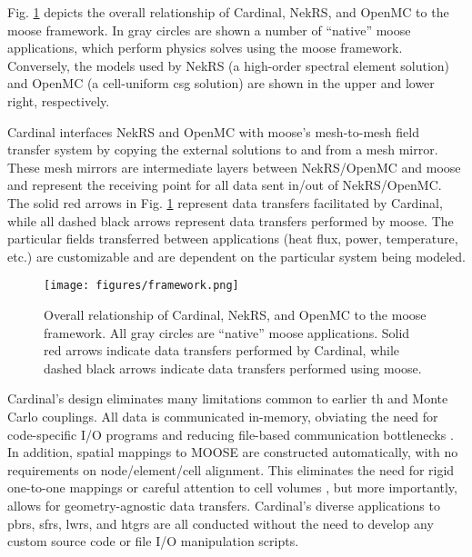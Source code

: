 \documentclass[3p,,preprint,11pt]{elsarticle}
\begin{document}
Fig. \ref{fig:framework} depicts the overall relationship of Cardinal, NekRS, and OpenMC to the \gls{moose} framework. In gray circles are shown a number of ``native'' \gls{moose} applications, which perform physics solves using the \gls{moose} framework. Conversely, the models used by NekRS (a high-order spectral element solution) and OpenMC (a cell-uniform \gls{csg} solution) are shown in the upper and lower right, respectively. 

Cardinal interfaces NekRS and OpenMC with \gls{moose}'s mesh-to-mesh field transfer system by copying the external solutions to and from a mesh mirror. These mesh mirrors are intermediate layers between NekRS/OpenMC and \gls{moose} and represent the receiving point for all data sent in/out of NekRS/OpenMC. The solid red arrows in Fig. \ref{fig:framework} represent data transfers facilitated by Cardinal, while all dashed black arrows represent data transfers performed by \gls{moose}. The particular fields transferred between applications (heat flux, power, temperature, etc.) are customizable and are dependent on the particular system being modeled. 

\begin{figure}[!htb]
\centering
\texttt{[image: figures/framework.png]}
\caption{\centering Overall relationship of Cardinal, NekRS, and OpenMC to the \gls{moose} framework. All gray circles are ``native'' \gls{moose} applications. Solid red arrows indicate data transfers performed by Cardinal, while dashed black arrows indicate data transfers performed using \gls{moose}.}
\label{fig:framework}
\end{figure}

Cardinal's design eliminates many limitations common to earlier \gls{th} and Monte Carlo couplings. All data is communicated in-memory, obviating the need
for code-specific I/O programs \cite{ivanov_2013,zhang,mylonakis} and reducing file-based communication bottlenecks
\cite{guo_2017}. In addition, spatial mappings to MOOSE are constructed automatically, with no requirements on node/element/cell alignment. This eliminates the need for rigid one-to-one mappings \cite{gurecky} or careful attention to cell volumes \cite{romano_enrico}, but more importantly, allows for geometry-agnostic data transfers. Cardinal's diverse applications to \glspl{pbr}, \glspl{sfr}, \glspl{lwr}, and \glspl{htgr} are all conducted without the need to develop any custom source code or file I/O manipulation scripts.
\end{document}
